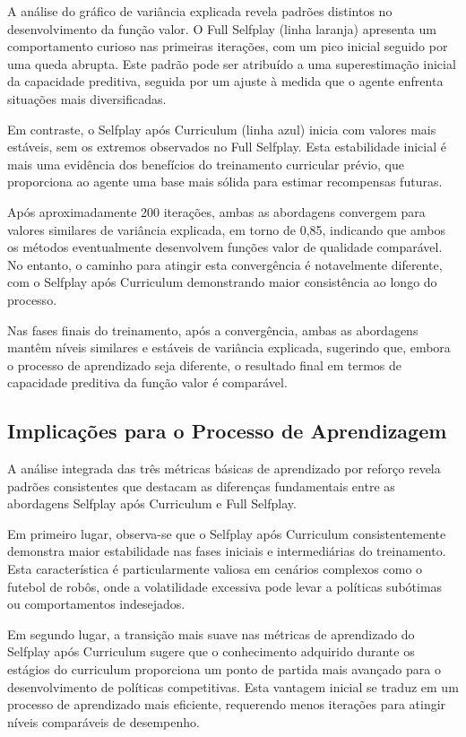 A análise do gráfico de variância explicada revela padrões distintos no desenvolvimento da função valor. O Full Selfplay (linha laranja) apresenta um comportamento curioso nas primeiras iterações, com um pico inicial seguido por uma queda abrupta. Este padrão pode ser atribuído a uma superestimação inicial da capacidade preditiva, seguida por um ajuste à medida que o agente enfrenta situações mais diversificadas.

Em contraste, o Selfplay após Curriculum (linha azul) inicia com valores mais estáveis, sem os extremos observados no Full Selfplay. Esta estabilidade inicial é mais uma evidência dos benefícios do treinamento curricular prévio, que proporciona ao agente uma base mais sólida para estimar recompensas futuras.

Após aproximadamente 200 iterações, ambas as abordagens convergem para valores similares de variância explicada, em torno de 0,85, indicando que ambos os métodos eventualmente desenvolvem funções valor de qualidade comparável. No entanto, o caminho para atingir esta convergência é notavelmente diferente, com o Selfplay após Curriculum demonstrando maior consistência ao longo do processo.

Nas fases finais do treinamento, após a convergência, ambas as abordagens mantêm níveis similares e estáveis de variância explicada, sugerindo que, embora o processo de aprendizado seja diferente, o resultado final em termos de capacidade preditiva da função valor é comparável.

\subsection{Implicações para o Processo de Aprendizagem}

A análise integrada das três métricas básicas de aprendizado por reforço revela padrões consistentes que destacam as diferenças fundamentais entre as abordagens Selfplay após Curriculum e Full Selfplay.

Em primeiro lugar, observa-se que o Selfplay após Curriculum consistentemente demonstra maior estabilidade nas fases iniciais e intermediárias do treinamento. Esta característica é particularmente valiosa em cenários complexos como o futebol de robôs, onde a volatilidade excessiva pode levar a políticas subótimas ou comportamentos indesejados.

Em segundo lugar, a transição mais suave nas métricas de aprendizado do Selfplay após Curriculum sugere que o conhecimento adquirido durante os estágios do curriculum proporciona um ponto de partida mais avançado para o desenvolvimento de políticas competitivas. Esta vantagem inicial se traduz em um processo de aprendizado mais eficiente, requerendo menos iterações para atingir níveis comparáveis de desempenho.

